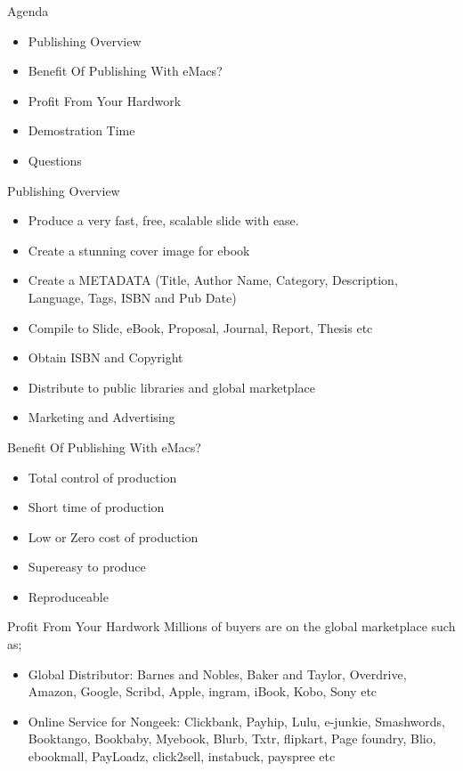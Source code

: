 \documentclass[english,12pt,presentation]{beamer}
\begin{document}
\begin{frame}{Agenda}
\begin{itemize}
\pause \item Publishing Overview
\pause \item Benefit Of Publishing With eMacs?
\pause \item Profit From Your Hardwork
\pause \item Demostration Time
\pause \item Questions
\end{itemize}
\end{frame}

\begin{frame}{Publishing Overview}
\begin{itemize}
\pause \item Produce a very fast, free, scalable slide with ease.
\pause \item Create a stunning cover image for ebook
\pause \item Create a METADATA (Title, Author Name, Category, Description, Language, Tags, ISBN and Pub Date)
\pause \item Compile to Slide, eBook, Proposal, Journal, Report, Thesis etc
\pause \item Obtain ISBN and Copyright
\pause \item Distribute to public libraries and global marketplace
\pause \item Marketing and Advertising
\end{itemize}
\end{frame}

\begin{frame}{Benefit Of Publishing With eMacs?}
\begin{itemize}
\pause \item Total control of production
\pause \item Short time of production
\pause \item Low or Zero cost of production
\pause \item Supereasy to produce
\pause \item Reproduceable
\end{itemize}
\end{frame}

\begin{frame}{Profit From Your Hardwork}
Millions of buyers are on the global marketplace such as;
\begin{itemize}
\pause \item Global Distributor: \pause Barnes and Nobles, \pause Baker and Taylor, \pause Overdrive, \pause Amazon, \pause Google, \pause Scribd, \pause Apple, \pause ingram, \pause iBook, \pause Kobo, \pause Sony etc
\pause \item Online Service for Nongeek: Clickbank, \pause Payhip, \pause Lulu, \pause e-junkie, \pause Smashwords, \pause Booktango, \pause Bookbaby, \pause Myebook, \pause Blurb, \pause Txtr, \pause flipkart, \pause Page \pause foundry, \pause Blio, \pause ebookmall, \pause PayLoadz, \pause click2sell, \pause instabuck, \pause payspree etc
\end{itemize}
\end{frame}
\end{document}
